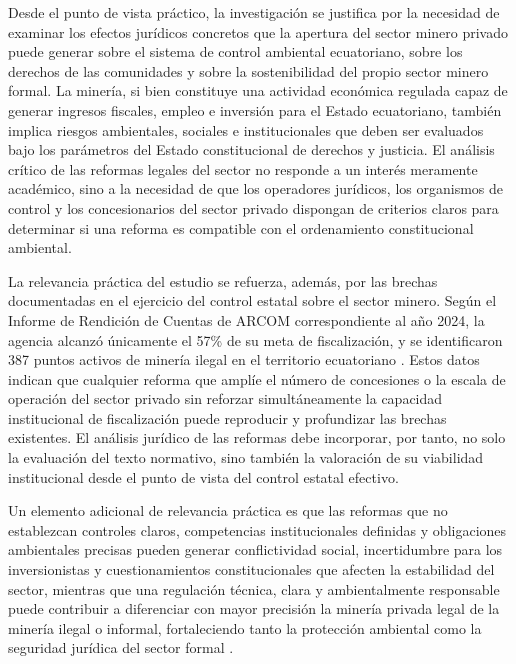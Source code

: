 Desde el punto de vista práctico, la investigación se justifica por la necesidad de examinar los efectos jurídicos concretos que la apertura del sector minero privado puede generar sobre el sistema de control ambiental ecuatoriano, sobre los derechos de las comunidades y sobre la sostenibilidad del propio sector minero formal. La minería, si bien constituye una actividad económica regulada capaz de generar ingresos fiscales, empleo e inversión para el Estado ecuatoriano, también implica riesgos ambientales, sociales e institucionales que deben ser evaluados bajo los parámetros del Estado constitucional de derechos y justicia. El análisis crítico de las reformas legales del sector no responde a un interés meramente académico, sino a la necesidad de que los operadores jurídicos, los organismos de control y los concesionarios del sector privado dispongan de criterios claros para determinar si una reforma es compatible con el ordenamiento constitucional ambiental.

La relevancia práctica del estudio se refuerza, además, por las brechas documentadas en el ejercicio del control estatal sobre el sector minero. Según el Informe de Rendición de Cuentas de ARCOM correspondiente al año 2024, la agencia alcanzó únicamente el 57\% de su meta de fiscalización, y se identificaron 387 puntos activos de minería ilegal en el territorio ecuatoriano \parencite{arcom_rendicion_cuentas_2024}. Estos datos indican que cualquier reforma que amplíe el número de concesiones o la escala de operación del sector privado sin reforzar simultáneamente la capacidad institucional de fiscalización puede reproducir y profundizar las brechas existentes. El análisis jurídico de las reformas debe incorporar, por tanto, no solo la evaluación del texto normativo, sino también la valoración de su viabilidad institucional desde el punto de vista del control estatal efectivo.

Un elemento adicional de relevancia práctica es que las reformas que no establezcan controles claros, competencias institucionales definidas y obligaciones ambientales precisas pueden generar conflictividad social, incertidumbre para los inversionistas y cuestionamientos constitucionales que afecten la estabilidad del sector, mientras que una regulación técnica, clara y ambientalmente responsable puede contribuir a diferenciar con mayor precisión la minería privada legal de la minería ilegal o informal, fortaleciendo tanto la protección ambiental como la seguridad jurídica del sector formal \parencite{grefa_valencia_2021,villacis_calvas_2022}.

